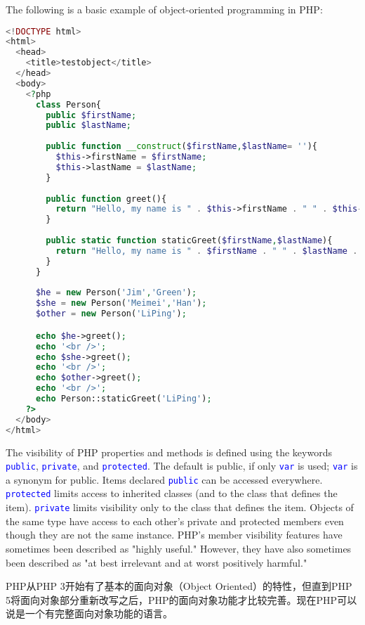 The following is a basic example of object-oriented programming in PHP:

\begin{lstlisting}[language=PHP]
<!DOCTYPE html>
<html>
  <head>
    <title>testobject</title>
  </head>
  <body>
    <?php
      class Person{
        public $firstName;
        public $lastName;
        
        public function __construct($firstName,$lastName= ''){
          $this->firstName = $firstName;
          $this->lastName = $lastName;
        }
        
        public function greet(){
          return "Hello, my name is " . $this->firstName . " " . $this->lastName . ".";
        }
        
        public static function staticGreet($firstName,$lastName){
          return "Hello, my name is " . $firstName . " " . $lastName . "."; 
        }
      }
      
      $he = new Person('Jim','Green');
      $she = new Person('Meimei','Han');
      $other = new Person('LiPing');

      echo $he->greet();
      echo '<br />';
      echo $she->greet();
      echo '<br />';
      echo $other->greet();
      echo '<br />';
      echo Person::staticGreet('LiPing');
    ?>
  </body>
</html>
\end{lstlisting}

The visibility of PHP properties and methods is defined using the keywords \textcolor{Blue}{\texttt{public}}, \textcolor{Blue}{\texttt{private}}, and \textcolor{Blue}{\texttt{protected}}. The default is public, if only \textcolor{Blue}{\texttt{var}} is used; \textcolor{Blue}{\texttt{var}} is a synonym for public. Items declared \textcolor{Blue}{\texttt{public}} can be accessed everywhere. \textcolor{Blue}{\texttt{protected}} limits access to inherited classes (and to the class that defines the item). \textcolor{Blue}{\texttt{private}} limits visibility only to the class that defines the item. Objects of the same type have access to each other's private and protected members even though they are not the same instance. PHP's member visibility features have sometimes been described as "highly useful." However, they have also sometimes been described as "at best irrelevant and at worst positively harmful."


PHP从PHP 3开始有了基本的面向对象（Object Oriented）的特性，但直到PHP 5将面向对象部分重新改写之后，PHP的面向对象功能才比较完善。现在PHP可以说是一个有完整面向对象功能的语言。

